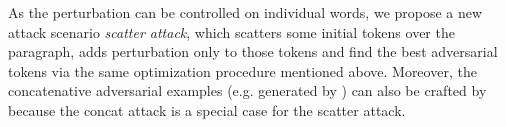  As the perturbation can be controlled on individual words, we propose a new attack scenario \textit{scatter attack}, which scatters some initial tokens over the paragraph, adds perturbation only to those tokens and find the best adversarial tokens via the same optimization procedure mentioned above. Moreover, the concatenative adversarial examples (e.g. generated by \advcodecsent) can also be crafted by \advcodecword because the concat attack is a special case for the scatter attack.

\fi
 


